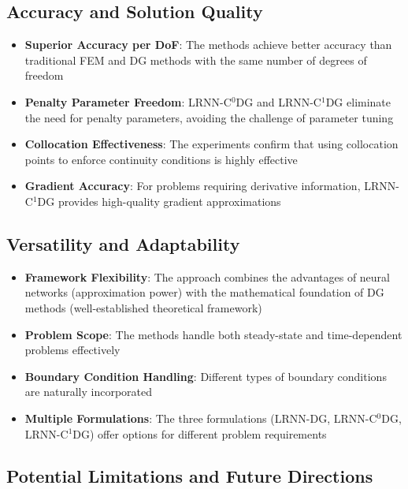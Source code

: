 \documentclass[11pt,a4paper]{article}
\begin{document}
\subsection{Accuracy and Solution Quality}

\begin{itemize}
    \item \textbf{Superior Accuracy per DoF}: The methods achieve better accuracy than traditional FEM and DG methods with the same number of degrees of freedom
    
    \item \textbf{Penalty Parameter Freedom}: LRNN-C$^0$DG and LRNN-C$^1$DG eliminate the need for penalty parameters, avoiding the challenge of parameter tuning
    
    \item \textbf{Collocation Effectiveness}: The experiments confirm that using collocation points to enforce continuity conditions is highly effective
    
    \item \textbf{Gradient Accuracy}: For problems requiring derivative information, LRNN-C$^1$DG provides high-quality gradient approximations
\end{itemize}

\subsection{Versatility and Adaptability}

\begin{itemize}
    \item \textbf{Framework Flexibility}: The approach combines the advantages of neural networks (approximation power) with the mathematical foundation of DG methods (well-established theoretical framework)
    
    \item \textbf{Problem Scope}: The methods handle both steady-state and time-dependent problems effectively
    
    \item \textbf{Boundary Condition Handling}: Different types of boundary conditions are naturally incorporated
    
    \item \textbf{Multiple Formulations}: The three formulations (LRNN-DG, LRNN-C$^0$DG, LRNN-C$^1$DG) offer options for different problem requirements
\end{itemize}

\subsection{Potential Limitations and Future Directions}
\end{document}
